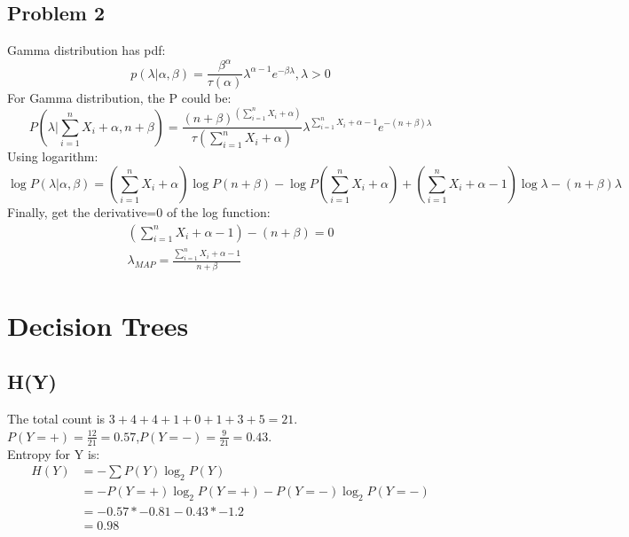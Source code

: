 \documentclass{article}
\begin{document}
\subsection{Problem 2}
Gamma distribution has pdf:
\begin{displaymath}
p(\lambda|\alpha,\beta)=\frac{\beta^{\alpha}}{\tau(\alpha)}\lambda^{\alpha-1}e^{-\beta \lambda},\lambda>0
\end{displaymath}
For Gamma distribution, the P could be:
\begin{displaymath}
P(\lambda|\sum_{i=1}^{n} X_i+\alpha,n+\beta)=\frac{(n+\beta)^{(\sum_{i=1}^{n}X_i+\alpha)}}{\tau(\sum_{i=1}^{n}X_i+\alpha)}\lambda^{\sum_{i=1}^{n}X_i+\alpha-1}e^{-(n+\beta) \lambda}
\end{displaymath}
Using logarithm:
\begin{displaymath}
\log P(\lambda|\alpha,\beta)=(\sum_{i=1}^{n} X_i+\alpha)\log P(n+\beta)-\log P(\sum_{i=1}^{n} X_i+\alpha)+(\sum_{i=1}^{n} X_i+\alpha-1)\log \lambda-(n+\beta)\lambda
\end{displaymath}
Finally, get the derivative=0 of the log function:
\begin{align*}
(\sum_{i=1}^{n} X_i+\alpha-1)-(n+\beta)=0\\
\lambda_{MAP}=\frac{\sum_{i=1}^{n} X_i+\alpha-1}{n+\beta}
\end{align*}



\section{Decision Trees}
\subsection{H(Y)}
The total count is $3+4+4+1+0+1+3+5=21$. \\
$P(Y=+)=\frac{12}{21}=0.57$,$P(Y=-)=\frac{9}{21}=0.43$.\\
Entropy for Y is:
\begin{align*}
H(Y)&=-\sum P(Y)\log_2 P(Y)\\
	 &=-P(Y=+)\log_2 P(Y=+)-P(Y=-)\log_2 P(Y=-)\\
	 &=-0.57*-0.81-0.43*-1.2\\
	 &=0.98
\end{align*}
\end{document}
